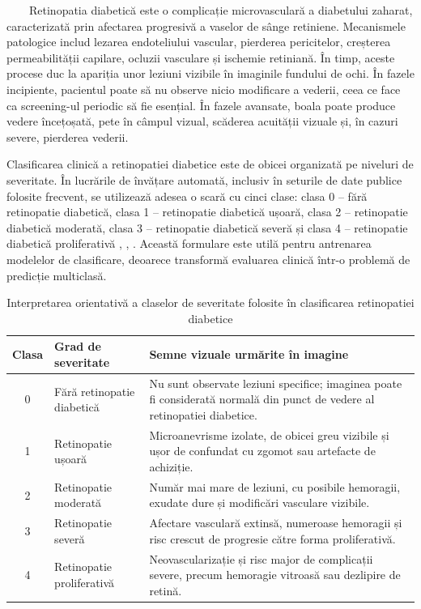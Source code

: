 \documentclass[12pt, a4paper, oneside, romanian]{teza-upb}
\begin{document}
\ \ \ \ Retinopatia diabetică este o complicație microvasculară a diabetului zaharat, caracterizată prin afectarea progresivă a vaselor de sânge retiniene. Mecanismele patologice includ lezarea endoteliului vascular, pierderea pericitelor, creșterea permeabilității capilare, ocluzii vasculare și ischemie retiniană. În timp, aceste procese duc la apariția unor leziuni vizibile în imaginile fundului de ochi. În fazele incipiente, pacientul poate să nu observe nicio modificare a vederii, ceea ce face ca screening-ul periodic să fie esențial. În fazele avansate, boala poate produce vedere încețoșată, pete în câmpul vizual, scăderea acuității vizuale și, în cazuri severe, pierderea vederii.
\bigskip

Clasificarea clinică a retinopatiei diabetice este de obicei organizată pe niveluri de severitate. În lucrările de învățare automată, inclusiv în seturile de date publice folosite frecvent, se utilizează adesea o scară cu cinci clase: clasa 0 -- fără retinopatie diabetică, clasa 1 -- retinopatie diabetică ușoară, clasa 2 -- retinopatie diabetică moderată, clasa 3 -- retinopatie diabetică severă și clasa 4 -- retinopatie diabetică proliferativă \cite{3_gulshan2016development}, \cite{6_wang2021deep}, \cite{14_liu2022deepdrid}. Această formulare este utilă pentru antrenarea modelelor de clasificare, deoarece transformă evaluarea clinică într-o problemă de predicție multiclasă.
\bigskip

\begin{table}[H]
\centering
\caption{Interpretarea orientativă a claselor de severitate folosite în clasificarea retinopatiei diabetice}
\label{tab:stadii-dr}
\begin{tabular}{|c|p{4cm}|p{7cm}|}
\hline
\textbf{Clasa} & \textbf{Grad de severitate} & \textbf{Semne vizuale urmărite în imagine} \\
\hline
0 & Fără retinopatie diabetică & Nu sunt observate leziuni specifice; imaginea poate fi considerată normală din punct de vedere al retinopatiei diabetice. \\
\hline
1 & Retinopatie ușoară & Microanevrisme izolate, de obicei greu vizibile și ușor de confundat cu zgomot sau artefacte de achiziție. \\
\hline
2 & Retinopatie moderată & Număr mai mare de leziuni, cu posibile hemoragii, exudate dure și modificări vasculare vizibile. \\
\hline
3 & Retinopatie severă & Afectare vasculară extinsă, numeroase hemoragii și risc crescut de progresie către forma proliferativă. \\
\hline
4 & Retinopatie proliferativă & Neovascularizație și risc major de complicații severe, precum hemoragie vitroasă sau dezlipire de retină. \\
\hline
\end{tabular}
\end{table}
\end{document}
